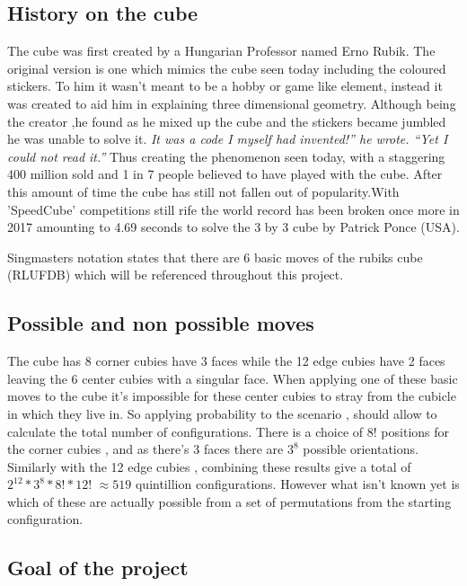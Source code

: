 \documentclass{article}
\begin{document}
\paragraph*{}
\subsection{History on the cube}
\cite{History}
The cube was first created by a Hungarian Professor named Erno Rubik. The original version is one which mimics the cube seen today including the coloured stickers. To him it wasn't meant to be a hobby or game like element, instead it was created to aid him in explaining three dimensional geometry. Although being the creator ,he found as he mixed up the cube and the stickers became jumbled he was unable to solve it.
\textit{It was a code I myself had invented!” he wrote. “Yet I could not read it.”}
Thus creating the phenomenon seen today, with a staggering 400 million sold and  1 in 7 people believed to have played with the cube. After this amount of time the cube has still not fallen out of popularity.With 'SpeedCube' competitions still rife the world record has been broken once more in 2017 amounting to 4.69 seconds to solve the 3 by 3 cube by Patrick Ponce (USA).\cite{Record}

Singmasters \cite{Magic}%
notation states that there are 6 basic moves of the rubiks cube (RLUFDB) which will be referenced throughout this project.
\subsection{Possible and non possible moves}

The cube has 8 corner cubies have 3 faces while the 12 edge cubies have 2 faces leaving the 6 center cubies with a singular face. When applying one of these basic moves to the cube it's impossible for these center cubies to stray from the cubicle in which they live in.
So applying probability to the scenario , should allow to calculate the total number of configurations.
There is a choice of 8! positions for the corner cubies , and as there's 3 faces there are $3^8$ possible orientations. Similarly with the 12 edge cubies , combining these results give a total of $2^{12} * 3^8 * 8! * 12!$ $\approx 519$ quintillion configurations.
However what isn't known yet is which of these are actually possible from a set of permutations from the starting configuration.

\subsection{Goal of the project}
\end{document}
